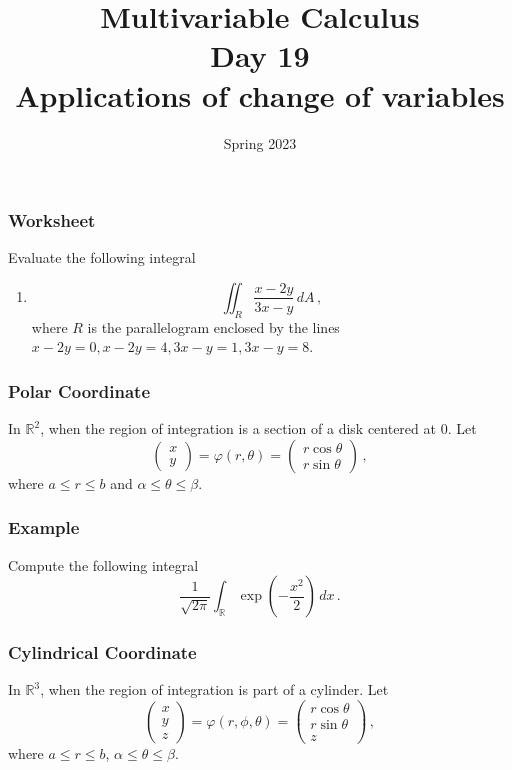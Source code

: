 \documentclass[aspectratio=169]{beamer}
\title{ Multivariable Calculus \\ Day  19 \\ Applications of change of variables }
\date{Spring 2023}
\newcommand{\R}{\mathbb{R}}
\begin{document}
\maketitle


\begin{frame}
    \frametitle{Worksheet}
    Evaluate the following integral
    \begin{enumerate}
        \item 
            \begin{equation*}
                \iint_R \frac{x - 2y}{3x - y} \, dA \,,
            \end{equation*}
            where $R$ is the parallelogram enclosed by the lines
            $x-2y = 0, x- 2y = 4, 3x-y = 1, 3x - y = 8$.

    \end{enumerate}
\end{frame}

\begin{frame}
    \frametitle{Polar Coordinate}
    In $\R^2$,
    when the region of integration is a section of a disk  centered at $0$.
    Let
    \begin{equation*}
        \begin{pmatrix}
            x \\ y
        \end{pmatrix}
        =
        \varphi(r,\theta) = 
        \begin{pmatrix}
            r\cos\theta \\
            r\sin\theta 
        \end{pmatrix} \,,
    \end{equation*}
    where $a \leq r \leq b$ and $\alpha \leq \theta \leq \beta$.
\end{frame}

\begin{frame}
    \frametitle{Example}
    Compute the following integral
    \begin{equation*}
        \frac{1}{\sqrt{2\pi}}\int_{\R} \exp\left(-\frac{x^2}{2}\right) \, dx \,.
    \end{equation*}
\end{frame}


\begin{frame}
    \frametitle{Cylindrical Coordinate}
    In $\R^3$, when the region of integration is part of a cylinder.
    Let
    \begin{equation*}
        \begin{pmatrix}
            x \\ y \\z
        \end{pmatrix}
        =
        \varphi(r,\phi,\theta) = 
        \begin{pmatrix}
            r\cos\theta\\
            r\sin\theta\\
            z
        \end{pmatrix} \,,
    \end{equation*}
    where $ a \leq r \leq b$, $\alpha \leq \theta \leq \beta$.
\end{frame}
\end{document}
